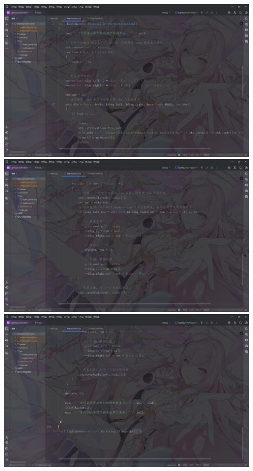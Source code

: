\documentclass[12pt, a4paper, oneside]{ctexart}
\begin{document}
\includegraphics[width=\textwidth]{../images/排列树回溯代码1.png}\\[0.5em]
\includegraphics[width=\textwidth]{../images/排列树回溯代码2.png}\\[0.5em]
\includegraphics[width=\textwidth]{../images/排列树回溯代码3.png}\\[0.5em]
\end{document}
